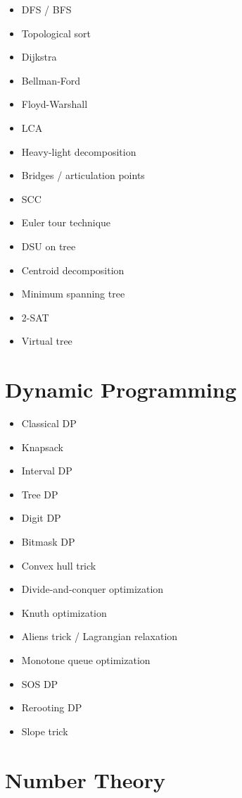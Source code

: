 \begin{itemize}
  \item DFS / BFS
  \item Topological sort
  \item Dijkstra
  \item Bellman-Ford
  \item Floyd-Warshall
  \item LCA
  \item Heavy-light decomposition
  \item Bridges / articulation points
  \item SCC
  \item Euler tour technique
  \item DSU on tree
  \item Centroid decomposition
  \item Minimum spanning tree
  \item 2-SAT
  \item Virtual tree
\end{itemize}

\section*{Dynamic Programming}

\begin{itemize}
  \item Classical DP
  \item Knapsack
  \item Interval DP
  \item Tree DP
  \item Digit DP
  \item Bitmask DP
  \item Convex hull trick
  \item Divide-and-conquer optimization
  \item Knuth optimization
  \item Aliens trick / Lagrangian relaxation
  \item Monotone queue optimization
  \item SOS DP
  \item Rerooting DP
  \item Slope trick
\end{itemize}

\section*{Number Theory}


